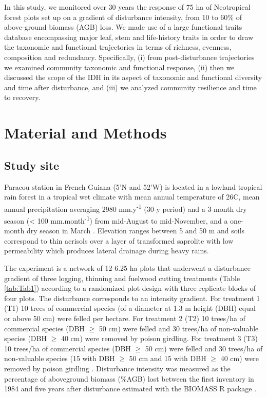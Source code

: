 \documentclass[fleqn,10pt]{ArtEcoFoG} %
\begin{document}
In this study, we monitored over 30 years the response of 75 ha of
Neotropical forest plots set up on a gradient of disturbance intensity,
from 10 to 60\% of above-ground biomass (AGB) loss. We made use of a
large functional traits database encompassing major leaf, stem and
life-history traits in order to draw the taxonomic and functional
trajectories in terms of richness, evenness, composition and redundancy.
Specifically, (i) from post-disturbance trajectories we examined
community taxonomic and functional response, (ii) then we discussed the
scope of the IDH in its aspect of taxonomic and functional diversity and
time after disturbance, and (iii) we analyzed community resilience and
time to recovery.

\section{Material and Methods}\label{material-and-methods}

\subsection{Study site}\label{study-site}

Paracou station in French Guiana (5'N and
52'W) is located in a lowland tropical rain forest in a
tropical wet climate with mean annual temperature of 26\textdegree C,
mean annual precipitation averaging 2980 mm.y\textsuperscript{-1} (30-y
period) and a 3-month dry season (\textless{} 100
mm.month\textsuperscript{-1}) from mid-August to mid-November, and a
one-month dry season in March \citep{Wagner2011}. Elevation ranges
between 5 and 50 m and soils correspond to thin acrisols over a layer of
transformed saprolite with low permeability which produces lateral
drainage during heavy rains.

The experiment is a network of 12 6.25 ha plots that underwent a
disturbance gradient of three logging, thinning and fuelwood cutting
treatments (Table \ref{tab:Tab1}) according to a randomized plot design
with three replicate blocks of four plots. The disturbance corresponds
to an intensity gradient. For treatment 1 (T1) 10 trees of commercial
species (of a diameter at 1.3 m height (DBH) equal or above 50 cm) were
felled per hectare. For treatment 2 (T2) 10 trees/ha of commercial
species (DBH \(\geq\) 50 cm) were felled and 30 trees/ha of non-valuable
species (DBH \(\geq\) 40 cm) were removed by poison girdling. For
treatment 3 (T3) 10 trees/ha of commercial species (DBH \(\geq\) 50 cm)
were felled and 30 trees/ha of non-valuable species (15 with DBH
\(\geq\) 50 cm and 15 with DBH \(\geq\) 40 cm) were removed by poison
girdling \citep{Schmitt1990}. Disturbance intensity was measured as the
percentage of aboveground biomass (\%AGB) lost between the first
inventory in 1984 and five years after disturbance \citep{Piponiot2016}
estimated with the BIOMASS R package \citep{Biomass2018}.
\end{document}
